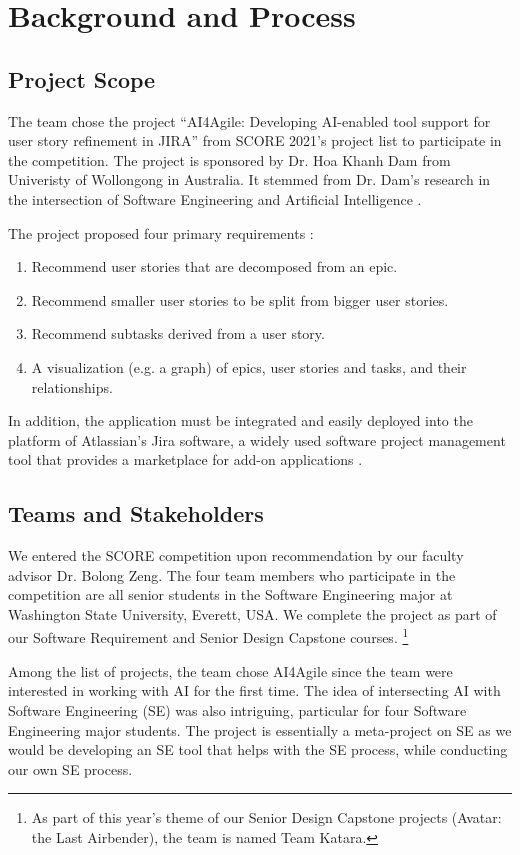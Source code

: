 \section{Background and Process}
\label{background}
\subsection{Project Scope}
\label{scope}
The team chose the project “AI4Agile: Developing AI-enabled tool support for user story refinement in JIRA” from SCORE 2021's project list to participate in the competition. The project is sponsored by Dr. Hoa Khanh Dam from Univeristy of Wollongong in Australia. It stemmed from Dr. Dam's research in the intersection of Software Engineering and Artificial Intelligence \cite{dam1,dam2,dam3}. 

The project proposed four primary requirements \cite{proposal}:

\begin{enumerate}
	\item Recommend user stories that are decomposed from an epic.
	\item Recommend smaller user stories to be split from bigger user stories.
	\item Recommend subtasks derived from a user story.
	\item A visualization (e.g. a graph) of epics, user stories and tasks, and their relationships.
\end{enumerate}

In addition, the application must be integrated and easily deployed into the platform of Atlassian’s Jira software, a widely used software project management tool that provides a marketplace for add-on applications \cite{jira1}. 

\subsection{Teams and Stakeholders}
We entered the SCORE competition upon recommendation by our faculty advisor Dr. Bolong Zeng. The four team members who participate in the competition are all senior students in the Software Engineering major at Washington State University, Everett, USA. We complete the project as part of our Software Requirement and Senior Design Capstone courses. \footnote{As part of this year's theme of our Senior Design Capstone projects (Avatar: the Last Airbender), the team is named Team Katara.} 

Among the list of projects, the team chose AI4Agile since the team were interested in working with AI for the first time. The idea of intersecting AI with Software Engineering (SE) was also intriguing, particular for four Software Engineering major students. The project is essentially a meta-project on SE as we would be developing an SE tool that helps with the SE process, while conducting our own SE process. 

